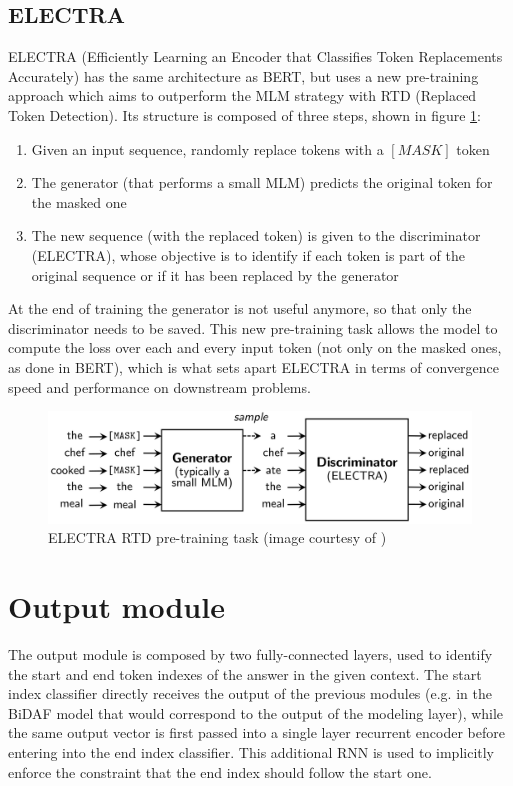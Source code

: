 \documentclass[a4paper,10pt]{report}
\begin{document}
\subsection{ELECTRA}\label{subsec:electra-model}
ELECTRA (Efficiently Learning an Encoder that Classifies Token Replacements Accurately) \cite{electra} has the same architecture as BERT, but uses a new pre-training approach which aims to outperform the MLM strategy with RTD (Replaced Token Detection). Its structure is composed of three steps, shown in figure \ref{fig:electra}:
\begin{enumerate}
  \item Given an input sequence, randomly replace tokens with a $[MASK]$ token
  \item The generator (that performs a small MLM) predicts the original token for the masked one
  \item The new sequence (with the replaced token) is given to the discriminator (ELECTRA), whose objective is to identify if each token is part of the original sequence or if it has been replaced by the generator
\end{enumerate}
At the end of training the generator is not useful anymore, so that only the discriminator needs to be saved.
This new pre-training task allows the model to compute the loss over each and every input token (not only on the masked ones, as done in BERT), which is what sets apart ELECTRA in terms of convergence speed and performance on downstream problems.

\begin{figure}[h]
  \center
  \includegraphics[width=0.85\linewidth]{electra-pretraining}
  \caption{ELECTRA RTD pre-training task (image courtesy of \cite{electra})}
  \label{fig:electra}
\end{figure}

\section{Output module}\label{sec:output-module}
The output module is composed by two fully-connected layers, used to identify the start and end token indexes of the answer in the given context. The start index classifier directly receives the output of the previous modules (e.g. in the BiDAF model that would correspond to the output of the modeling layer), while the same output vector is first passed into a single layer recurrent encoder before entering into the end index classifier. This additional RNN is used to implicitly enforce the constraint that the end index should follow the start one.
\end{document}
